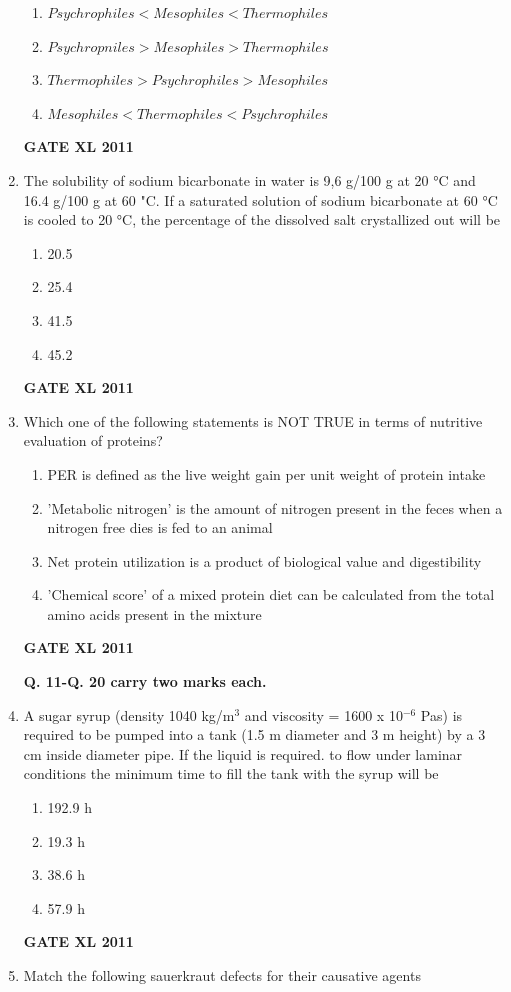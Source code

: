 \documentclass[journal,12pt,onecolumn]{IEEEtran}
\begin{document}
\begin{enumerate}
\begin{enumerate}
	\item $Psychrophiles < Mesophiles < Thermophiles$
	\item $Psychropniles > Mesophiles > Thermophiles$
	\item $Thermophiles > Psychrophiles > Mesophiles$
	\item $Mesophiles <Thermophiles < Psychrophiles$
\end{enumerate}
\hfill{\textbf{GATE XL 2011}}
\item{ The solubility of sodium bicarbonate in water is 9,6 g/100 g at 20 °C and 16.4 g/100 g at 60 "C. If a saturated solution of sodium bicarbonate at 60 °C is cooled to 20 °C, the percentage of the dissolved salt crystallized out will be}

\begin{enumerate}
	\item 20.5
	\item 25.4
	\item 41.5
	\item 45.2
\end{enumerate}
\hfill{\textbf{GATE XL 2011}}

\item {Which one of the following statements is NOT TRUE in terms of nutritive evaluation of proteins?}

\begin{enumerate}
	\item PER is defined as the live weight gain per unit weight of protein intake
	\item 'Metabolic nitrogen' is the amount of nitrogen present in the feces when a nitrogen free dies is fed to an animal
	\item Net protein utilization is a product of biological value and digestibility
	\item 'Chemical score' of a mixed protein diet can be calculated from the total amino acids present in the mixture
\end{enumerate}
\hfill{\textbf{GATE XL 2011}}
\begin{center}
\textbf{Q. 11-Q. 20 carry two marks each.}
\end{center}
\item {A sugar syrup (density 1040 kg/m$^3$ and viscosity = 1600 x 10$^{-6}$ Pas) is required to be pumped into a tank (1.5 m diameter and 3 m height) by a 3 cm inside diameter pipe. If the liquid is required. to flow under laminar conditions the minimum time to fill the tank with the syrup will be}
\begin{enumerate}
	\item 192.9 h
	\item 19.3 h
	\item 38.6 h
	\item 57.9 h
\end{enumerate}
\hfill{\textbf{GATE XL 2011}}
\item {Match the following sauerkraut defects for their causative agents}
\newline
	\begin{minipage}{0.5\textwidth}
	\begin{flushleft}



\end{flushleft}
\end{minipage}
\end{enumerate}
\end{document}
